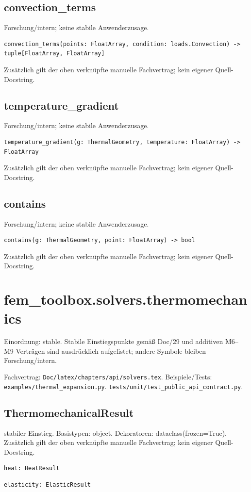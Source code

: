 \subsection{convection\_terms}
Forschung/intern; keine stabile Anwenderzusage.
\begin{lstlisting}
convection_terms(points: FloatArray, condition: loads.Convection) -> tuple[FloatArray, FloatArray]
\end{lstlisting}
Zusätzlich gilt der oben verknüpfte manuelle Fachvertrag; kein eigener Quell-Docstring.
\subsection{temperature\_gradient}
Forschung/intern; keine stabile Anwenderzusage.
\begin{lstlisting}
temperature_gradient(g: ThermalGeometry, temperature: FloatArray) -> FloatArray
\end{lstlisting}
Zusätzlich gilt der oben verknüpfte manuelle Fachvertrag; kein eigener Quell-Docstring.
\subsection{contains}
Forschung/intern; keine stabile Anwenderzusage.
\begin{lstlisting}
contains(g: ThermalGeometry, point: FloatArray) -> bool
\end{lstlisting}
Zusätzlich gilt der oben verknüpfte manuelle Fachvertrag; kein eigener Quell-Docstring.
\section{fem\_toolbox.solvers.thermomechanics}
Einordnung: stable. Stabile Einstiegspunkte gemäß Doc/29 und additiven M6–M9-Verträgen sind ausdrücklich aufgelistet; andere Symbole bleiben Forschung/intern.
\par Fachvertrag: \nolinkurl{Doc/latex/chapters/api/solvers.tex}. Beispiele/Tests:
\nolinkurl{examples/thermal_expansion.py}.
\nolinkurl{tests/unit/test_public_api_contract.py}.
\subsection{ThermomechanicalResult}
stabiler Einstieg.
Basistypen: object. Dekoratoren: dataclass(frozen=True).
Zusätzlich gilt der oben verknüpfte manuelle Fachvertrag; kein eigener Quell-Docstring.
\begin{lstlisting}
heat: HeatResult
\end{lstlisting}
\begin{lstlisting}
elasticity: ElasticResult
\end{lstlisting}
